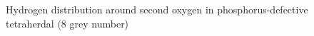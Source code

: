 \begin{figure}[h]
\begin{minipage}[h]{0.5\linewidth}
\end{minipage}
\hfill
\begin{minipage}[h]{0.5\linewidth}
\end{minipage}
\caption{Hydrogen distribution around second oxygen in phosphorus-defective tetraherdal (8 grey number)}
\label{HinO1and2}
\end{figure}

